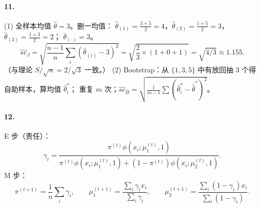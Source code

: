 \paragraph{11.}
(1) 全样本均值 $\hat\theta=3$。删一均值：
$\hat\theta_{(1)}=\frac{3+5}{2}=4$，$\hat\theta_{(2)}=\frac{1+5}{2}=3$，$\hat\theta_{(3)}=\frac{1+3}{2}=2$；
$\bar\theta_{(\cdot)}=3$。
\[
\widehat{se}_J=\sqrt{\frac{n-1}{n}\sum_i(\hat\theta_{(i)}-3)^2}
=\sqrt{\frac{2}{3}\times(1+0+1)}=\sqrt{4/3}\approx1.155 .
\]
（与理论 $S/\sqrt n=2/\sqrt3$ 一致。）
(2) Bootstrap：从 $\{1,3,5\}$ 中有放回抽 3 个得自助样本，算均值 $\hat\theta_i^*$；
重复 $m$ 次；$\widehat{se}_B=\sqrt{\frac{1}{m-1}\sum(\hat\theta^*_i-\bar{\hat\theta}^*)^2}$。

\paragraph{12.}
E 步（责任）：
\[
\gamma_{i}=\frac{\pi^{(t)}\phi(x_i;\mu_1^{(t)},1)}
{\pi^{(t)}\phi(x_i;\mu_1^{(t)},1)+(1-\pi^{(t)})\phi(x_i;\mu_2^{(t)},1)} .
\]
M 步：
\[
\pi^{(t+1)}=\frac1n\sum_i\gamma_i,\qquad
\mu_1^{(t+1)}=\frac{\sum_i\gamma_i x_i}{\sum_i\gamma_i},\qquad
\mu_2^{(t+1)}=\frac{\sum_i(1-\gamma_i)x_i}{\sum_i(1-\gamma_i)} .
\]

\vspace{6mm}
\begin{center}
\end{center}
